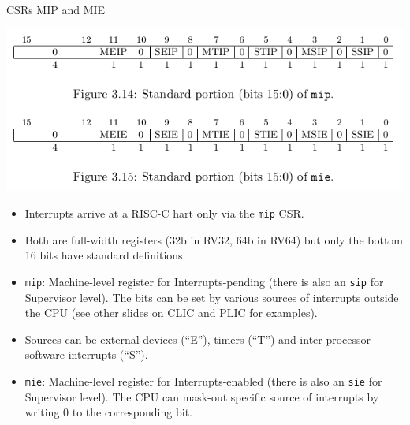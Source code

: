 \documentclass{article}
\begin{document}
\clearpage


\begin{center}
  {\Huge
    CSRs MIP and MIE}

  \vspace*{0.2in}

  \includegraphics[width=6in]{Figs/CSRs_MIP_MIE.png}

  \vspace*{0.2in}

  \begin{minipage}[t]{9.5in}
    \begin{itemize}\LARGE

    \item Interrupts arrive at a RISC-C hart only via the {\tt mip} CSR.

    \item Both are full-width registers (32b in RV32, 64b in RV64) but
      only the bottom 16 bits have standard definitions.

    \item {\tt mip}: Machine-level register for Interrupts-pending (there
      is also an {\tt sip} for Supervisor level).  The bits can be set
      by various sources of interrupts outside the CPU (see other slides
      on CLIC and PLIC for examples).

    \item Sources can be external devices (``E''), timers (``T'') and
      inter-processor software interrupts (``S'').

    \item {\tt mie}: Machine-level register for Interrupts-enabled (there
      is also an {\tt sie} for Supervisor level).  The CPU can mask-out
      specific source of interrupts by writing 0 to the corresponding
      bit.

    \end{itemize}

    \vspace{0.5in}

  \end{minipage}
\end{center}
\end{document}
